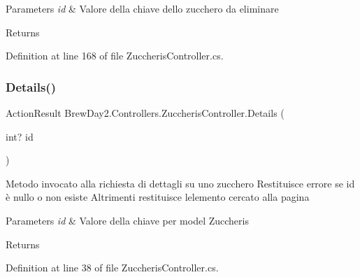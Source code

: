 \begin{DoxyParams}{Parameters}
{\em id} & Valore della chiave dello zucchero da eliminare\\
\hline
\end{DoxyParams}
\begin{DoxyReturn}{Returns}

\end{DoxyReturn}


Definition at line 168 of file Zuccheris\+Controller.\+cs.

\mbox{\label{class_brew_day2_1_1_controllers_1_1_zuccheris_controller_aa0b63d9d1577350252de922e0041c4c9}} 
\subsubsection{\texorpdfstring{Details()}{Details()}}
{\footnotesize\ttfamily Action\+Result Brew\+Day2.\+Controllers.\+Zuccheris\+Controller.\+Details (\begin{DoxyParamCaption}\item[{int?}]{id }\end{DoxyParamCaption})}



Metodo invocato alla richiesta di dettagli su uno zucchero Restituisce errore se id è nullo o non esiste Altrimenti restituisce l\textquotesingle{}elemento cercato alla pagina 


\begin{DoxyParams}{Parameters}
{\em id} & Valore della chiave per model Zuccheris\\
\hline
\end{DoxyParams}
\begin{DoxyReturn}{Returns}

\end{DoxyReturn}


Definition at line 38 of file Zuccheris\+Controller.\+cs.

\mbox{\label{class_brew_day2_1_1_controllers_1_1_zuccheris_controller_acd38549fec2cb20af4b6a41c94ba6b0a}} 
